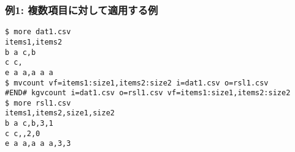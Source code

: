 \subsubsection*{例1: 複数項目に対して適用する例}



\begin{Verbatim}[baselinestretch=0.7,frame=single]
$ more dat1.csv
items1,items2
b a c,b
c c,
e a a,a a a
$ mvcount vf=items1:size1,items2:size2 i=dat1.csv o=rsl1.csv
#END# kgvcount i=dat1.csv o=rsl1.csv vf=items1:size1,items2:size2
$ more rsl1.csv
items1,items2,size1,size2
b a c,b,3,1
c c,,2,0
e a a,a a a,3,3
\end{Verbatim}
